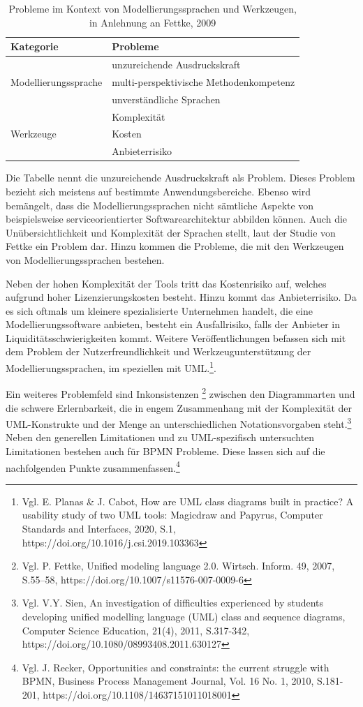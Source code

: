 \begin{table}[h]
\centering
\caption{Probleme im Kontext von Modellierungssprachen und Werkzeugen, in Anlehnung an Fettke, 2009}
\begin{tabular}{p{4cm} p{9cm}}
\toprule
\textbf{Kategorie} & \textbf{Probleme} \\
\midrule
\multirow{3}{*}{Modellierungssprache} &
unzureichende Ausdruckskraft \\
& multi-perspektivische Methodenkompetenz \\
& unverständliche Sprachen \\
\midrule
\multirow{3}{*}{Werkzeuge} &
Komplexität \\
& Kosten \\
& Anbieterrisiko \\
\bottomrule
\end{tabular}
\label{tab:modellierungsprobleme}

\end{table}

Die Tabelle nennt die unzureichende Ausdruckskraft als Problem. Dieses Problem bezieht sich meistens auf bestimmte Anwendungsbereiche. Ebenso wird bemängelt, dass die Modellierungssprachen nicht sämtliche Aspekte von beispielsweise serviceorientierter Softwarearchitektur abbilden können. Auch die Unübersichtlichkeit und Komplexität der Sprachen stellt, laut der Studie von Fettke ein Problem dar. Hinzu kommen die Probleme, die mit den Werkzeugen von Modellierungssprachen bestehen.

Neben der hohen Komplexität der Tools tritt das Kostenrisiko auf, welches aufgrund hoher Lizenzierungskosten besteht. Hinzu kommt das Anbieterrisiko. Da es sich oftmals um kleinere spezialisierte Unternehmen handelt, die eine Modellierungssoftware anbieten, besteht ein Ausfallrisiko, falls der Anbieter in Liquiditätsschwierigkeiten kommt. Weitere Veröffentlichungen befassen sich mit dem Problem der Nutzerfreundlichkeit und Werkzeugunterstützung der Modellierungssprachen, im speziellen mit UML.\footnote{Vgl. E. Planas \& J. Cabot, How are UML class diagrams built in practice? A usability study of two UML tools: Magicdraw and Papyrus, Computer Standards and Interfaces, 2020, S.1, https://doi.org/10.1016/j.csi.2019.103363}.

Ein weiteres Problemfeld sind Inkonsistenzen \footnote{ Vgl. P. Fettke, Unified modeling language 2.0. Wirtsch. Inform. 49, 2007, S.55–58, https://doi.org/10.1007/s11576-007-0009-6} zwischen den Diagrammarten und die schwere Erlernbarkeit, die in engem Zusammenhang mit der Komplexität der UML-Konstrukte und der Menge an unterschiedlichen Notationsvorgaben steht.\footnote{Vgl. V.Y. Sien, An investigation of difficulties experienced by students developing unified modelling language (UML) class and sequence diagrams, Computer Science Education, 21(4), 2011, S.317-342, https://doi.org/10.1080/08993408.2011.630127} Neben den generellen Limitationen und zu UML-spezifisch untersuchten Limitationen bestehen auch für BPMN Probleme. Diese lassen sich auf die nachfolgenden Punkte zusammenfassen.\footnote{Vgl. J. Recker, Opportunities and constraints: the current struggle with BPMN, Business Process Management Journal, Vol. 16 No. 1, 2010, S.181-201, https://doi.org/10.1108/14637151011018001} 

